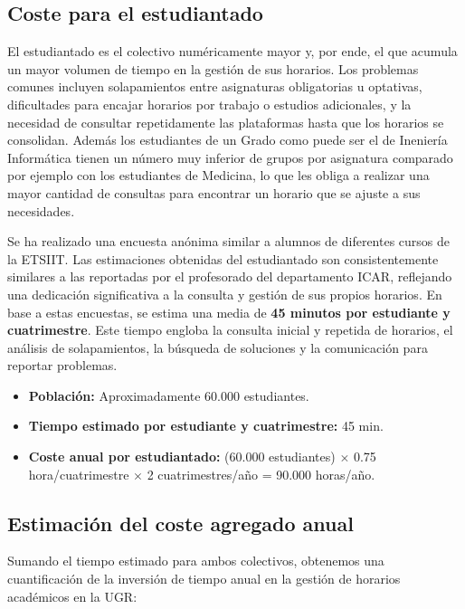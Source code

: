 \subsection{Coste para el estudiantado}

El estudiantado es el colectivo numéricamente mayor y, por ende, el que acumula un mayor volumen de tiempo en la gestión de sus horarios. Los problemas comunes incluyen solapamientos entre asignaturas obligatorias u optativas, dificultades para encajar horarios por trabajo o estudios adicionales, y la necesidad de consultar repetidamente las plataformas hasta que los horarios se consolidan. Además los estudiantes de un Grado como puede ser el de Ineniería Informática tienen un número muy inferior de grupos por asignatura comparado por ejemplo con los estudiantes de Medicina, lo que les obliga a realizar una mayor cantidad de consultas para encontrar un horario que se ajuste a sus necesidades.\newline

Se ha realizado una encuesta anónima similar a alumnos de diferentes cursos de la ETSIIT. Las estimaciones obtenidas del estudiantado son consistentemente similares a las reportadas por el profesorado del departamento ICAR, reflejando una dedicación significativa a la consulta y gestión de sus propios horarios. En base a estas encuestas, se estima una media de \textbf{45 minutos por estudiante y cuatrimestre}. Este tiempo engloba la consulta inicial y repetida de horarios, el análisis de solapamientos, la búsqueda de soluciones y la comunicación para reportar problemas.

\begin{itemize}
    \item \textbf{Población:} Aproximadamente 60.000 estudiantes.
    \item \textbf{Tiempo estimado por estudiante y cuatrimestre:} 45 min.
    \item \textbf{Coste anual por estudiantado:} (60.000 estudiantes) $\times$ 0.75 hora/cuatrimestre $\times$ 2 cuatrimestres/año = 90.000 horas/año.
\end{itemize}

\subsection{Estimación del coste agregado anual}

Sumando el tiempo estimado para ambos colectivos, obtenemos una cuantificación de la inversión de tiempo anual en la gestión de horarios académicos en la UGR:

